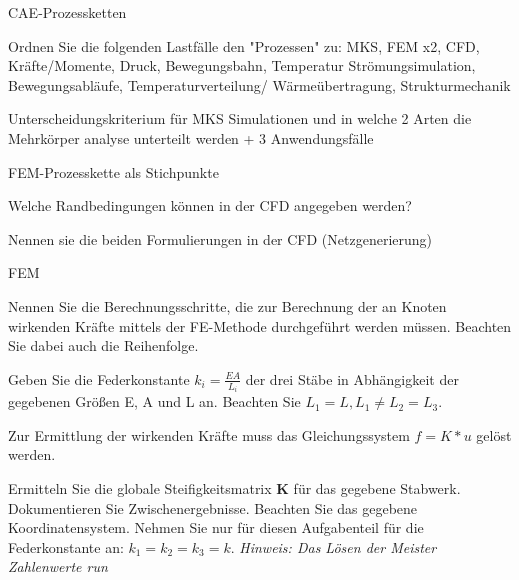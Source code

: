 \documentclass[
	ngerman,
	color = black,
	]{tudaexercise}
\begin{document}
\begin{task}[credit=18{,}5 P]{CAE-Prozessketten}
	\begin{subtask}[credit=2 P]
		Ordnen Sie die folgenden Lastfälle den "Prozessen" zu:
		MKS, FEM x2, CFD, Kräfte/Momente, Druck, Bewegungsbahn, Temperatur
		Strömungsimulation, Bewegungsabläufe, Temperaturverteilung/ Wärmeübertragung, Strukturmechanik %
	\end{subtask}
	
	\begin{subtask}[credit=4 P]
		Unterscheidungskriterium für MKS Simulationen und in welche 2 Arten die Mehrkörper analyse unterteilt werden
		+ 3 Anwendungsfälle %
	\end{subtask}	
	
	\begin{subtask}[credit=4 P]
		FEM-Prozesskette als Stichpunkte
	\end{subtask}
	
	\begin{subtask}[credit=2{,}5 P]
		Welche Randbedingungen können in der CFD angegeben werden?
	\end{subtask}
	
	\begin{subtask}[credit=4 P]
		
	\end{subtask}
	
	\begin{subtask}[credit=2 P]
		Nennen sie die beiden Formulierungen in der CFD (Netzgenerierung)
	\end{subtask}
\end{task}

\begin{task}[credit=23 P]{FEM}
	\begin{subtask}[credit=5 P]
		Nennen Sie die Berechnungsschritte, die zur Berechnung der an Knoten wirkenden Kräfte mittels der FE-Methode durchgeführt werden müssen.
		Beachten Sie dabei auch die Reihenfolge.
	\end{subtask}
	
	\begin{subtask}[credit=2 P]
		Geben Sie die Federkonstante $k_i=\frac{EA}{L_i}$ der drei Stäbe in Abhängigkeit der gegebenen Größen E, A und L an.
		Beachten Sie $L_1 = L, L_1 \ne L_2 = L_3$.
	\end{subtask}
	
	Zur Ermittlung der wirkenden Kräfte muss das Gleichungssystem $f = K * u$ gelöst werden.
	
	\begin{subtask}[credit=16 P]
		Ermitteln Sie die globale Steifigkeitsmatrix $\mathbf{K}$ für das gegebene Stabwerk.
		Dokumentieren Sie Zwischenergebnisse.
		Beachten Sie das gegebene Koordinatensystem.
		Nehmen Sie nur für diesen Aufgabenteil für die Federkonstante an: $k_1 = k_2 = k_3 = k$.
		\textit{Hinweis: Das Lösen der Meister Zahlenwerte run}
	\end{subtask}
\end{task}
\end{document}
